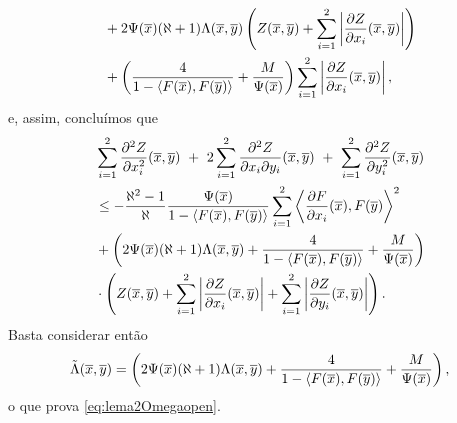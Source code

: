\begin{demonstracao}
\begin{equation*}
\begin{aligned}
&+
2\Psi(\overline{x})(\aleph+1)\Lambda(\overline{x},\overline{y})\left(Z(\overline{x},\overline{y})
+\sum_{i=1}^2\left|\frac{\partial Z}{\partial x_i}(\overline{x},\overline{y})\right|\right) \\
&+\left(\frac{4}{1 - \langle F(\overline{x}), F(\overline{y}) \rangle} + \frac{M}{\Psi(\overline{x})}\right)
\sum_{i=1}^2\left|\frac{\partial Z}{\partial x_i}(\overline{x},\overline{y})\right|,
\end{aligned}
\end{equation*}
e, assim, conclu\'imos que
\begin{equation*}
\begin{aligned}
&\sum_{i=1}^2\frac{\partial^2 Z}{\partial x_i^2}(\xb,\yb) \ + \ 
2 \sum_{i=1}^2 \frac{\partial^2 Z}{\partial x_i \partial y_i}(\xb,\yb) \ + \ 
\sum_{i=1}^2 \frac{\partial^2 Z}{\partial y_i^2}(\xb,\yb)  \\
& \leq
- \frac{\aleph^2 - 1}{\aleph} \frac{\Psi(\xb)}{1 - \langle F(\xb), F(\yb) \rangle} \sum_{i=1}^2 \left\langle \frac{\partial F}{\partial x_i}(\xb), F(\yb) \right\rangle^2 \\
&+
\left(2\Psi(\xb)(\aleph+1)\Lambda(\xb,\yb) +
\frac{4}{1 - \langle F(\xb), F(\yb) \rangle} + \frac{M}{\Psi(\xb)}\right) \\
&\cdot\left( Z(\xb,\yb) + \sum_{i=1}^2 \left| \frac{\partial Z}{\partial x_i}(\xb,\yb) \right| + \sum_{i=1}^2 \left| \frac{\partial Z}{\partial y_i}(\xb,\yb) \right| \right).
\end{aligned}
\end{equation*}
Basta considerar ent\~ao
\[
\tilde\Lambda(\overline{x},\overline{y}) =
\left(2\Psi(\overline{x})(\aleph+1)\Lambda(\overline{x},\overline{y}) +
\frac{4}{1 - \langle F(\overline{x}), F(\overline{y}) \rangle} + \frac{M}{\Psi(\overline{x})}\right),
\]
o que prova \eqref{eq:lema2Omegaopen}.
\end{demonstracao}


